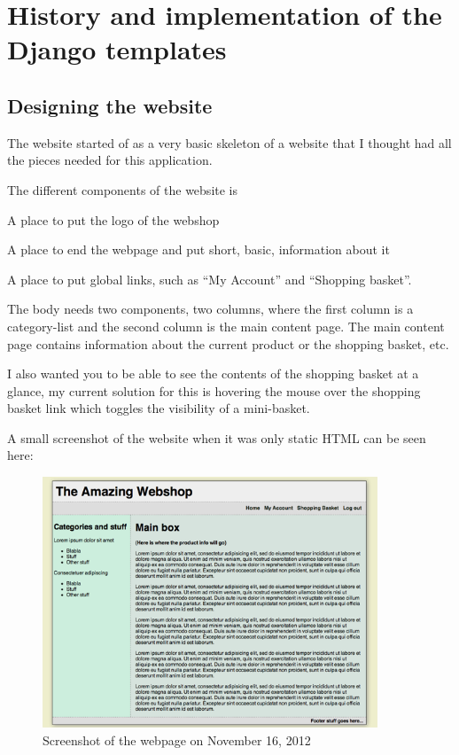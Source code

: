 \documentclass[12pt, a4paper,titlepage]{article}
\begin{document}

\section{History and implementation of the Django templates}
\subsection{Designing the website}
The website started of as a very basic skeleton of a website that I thought
had all the pieces needed for this application. 

The different components of the website is
\begin{description}
\setlength\itemsep{-5pt}
\item[Header] A place to put the logo of the webshop
\item[Footer] A place to end the webpage and put short, basic, information
		about it
\item[Navigation] A place to put global links, such as ``My Account'' and ``Shopping basket''.
\item[Body] The body needs two components, two columns, where the first
	column is a category-list and the second column is the main content page.
	The main content page contains information about the current product
	or the shopping basket, etc.
\end{description}

I also wanted you to be able to see the contents of the shopping basket at a
glance, my current solution for this is hovering the mouse over the shopping
basket link which toggles the visibility of a mini-basket.

A small screenshot of the website when it was only static HTML can be seen here:
\begin{figure}[H]
\centering
\includegraphics[width=10cm]{Screenshot_2012-11-16.png}
\caption{Screenshot of the webpage on November 16, 2012}
\label{fig:sshot}
\end{figure}
\end{document}
